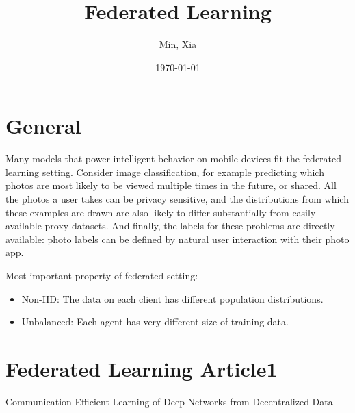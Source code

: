 \documentclass[12pt, a4paper, oneside]{article}
\title{\textbf{Federated Learning}}
\author{Min, Xia}
\date{\today}
\begin{document}
\maketitle
\setcounter{page}{1}
\section{General}
    Many models that power intelligent behavior on mobile devices fit the federated learning setting. Consider image classification, for example predicting which photos are most likely to be viewed multiple times in the future, or shared. All the photos a user takes can be privacy sensitive, and the distributions from which these examples are drawn are also likely to differ substantially from easily available proxy datasets. And finally, the labels for these problems are directly available: photo labels can be defined by natural user interaction with their photo app.


    Most important property of federated setting:
    \begin{itemize}
        \item Non-IID: The data on each client has different population distributions.
        \item Unbalanced: Each agent has very different size of training data.
    \end{itemize}


\section{Federated Learning Article1}
    Communication-Efficient Learning of Deep Networks from Decentralized Data\cite{mcmahan2017communication}
    
\newpage


\end{document}
